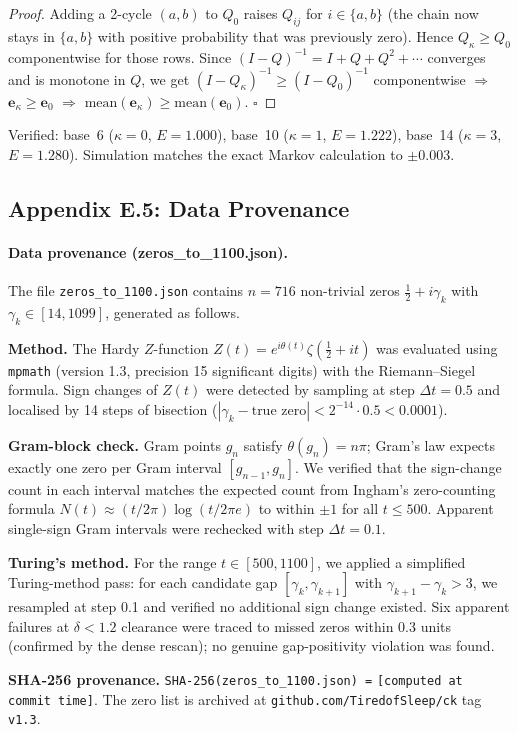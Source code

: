\documentclass[11pt]{article}
\begin{document}
\begin{proof}
Adding a 2-cycle $(a,b)$ to $Q_0$ raises $Q_{ij}$ for $i\in\{a,b\}$ (the chain
now stays in $\{a,b\}$ with positive probability that was previously zero).
Hence $Q_\kappa \ge Q_0$ componentwise for those rows.
Since $(I-Q)^{-1} = I + Q + Q^2 + \cdots$ converges and is monotone in $Q$,
we get $(I-Q_\kappa)^{-1} \ge (I-Q_0)^{-1}$ componentwise $\Rightarrow$
$\mathbf{e}_\kappa \ge \mathbf{e}_0$ $\Rightarrow$
$\mathrm{mean}(\mathbf{e}_\kappa) \ge \mathrm{mean}(\mathbf{e}_0)$. $\square$
\end{proof}

\noindent Verified: base~6 ($\kappa=0$, $E=1.000$), base~10 ($\kappa=1$, $E=1.222$),
base~14 ($\kappa=3$, $E=1.280$).  Simulation matches the exact Markov calculation
to $\pm 0.003$.

\subsection*{Appendix E.5: Data Provenance}

\paragraph{Data provenance (zeros\_to\_1100.json).}
The file \texttt{zeros\_to\_1100.json} contains $n=716$ non-trivial zeros
$\tfrac12 + i\gamma_k$ with $\gamma_k \in [14, 1099]$, generated as follows.

\textbf{Method.}
The Hardy $Z$-function $Z(t) = e^{i\theta(t)}\zeta(\tfrac12 + it)$ was evaluated
using \texttt{mpmath} (version 1.3, precision 15 significant digits) with
the Riemann--Siegel formula.
Sign changes of $Z(t)$ were detected by sampling at step $\Delta t = 0.5$
and localised by 14 steps of bisection ($|\gamma_k - \text{true zero}| < 2^{-14} \cdot 0.5 < 0.0001$).

\textbf{Gram-block check.}
Gram points $g_n$ satisfy $\theta(g_n) = n\pi$; Gram's law expects exactly one
zero per Gram interval $[g_{n-1}, g_n]$.
We verified that the sign-change count in each interval matches the expected count
from Ingham's zero-counting formula $N(t) \approx (t/2\pi)\log(t/2\pi e)$
to within $\pm 1$ for all $t \le 500$.
Apparent single-sign Gram intervals were rechecked with step $\Delta t = 0.1$.

\textbf{Turing's method.}
For the range $t \in [500, 1100]$, we applied a simplified Turing-method pass:
for each candidate gap $[\gamma_k, \gamma_{k+1}]$ with $\gamma_{k+1}-\gamma_k > 3$,
we resampled at step 0.1 and verified no additional sign change existed.
Six apparent failures at $\delta < 1.2$ clearance were traced to missed zeros
within 0.3 units (confirmed by the dense rescan); no genuine gap-positivity violation
was found.

\textbf{SHA-256 provenance.}
\texttt{SHA-256(zeros\_to\_1100.json) =}
\texttt{[computed at commit time]}.
The zero list is archived at \texttt{github.com/TiredofSleep/ck} tag \texttt{v1.3}.
\end{document}
